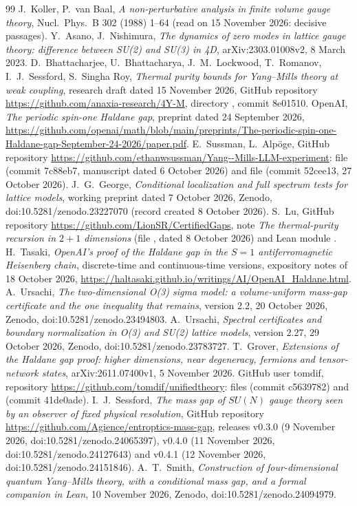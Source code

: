 \documentclass[11pt,a4paper]{article}
\theoremstyle{plain}
\theoremstyle{definition}
\theoremstyle{remark}
\numberwithin{equation}{section}
\begin{document}
{\begin{thebibliography}{99}
 J.~Koller, P.~van Baal, \emph{A non-perturbative analysis in finite volume gauge theory}, Nucl.\ Phys.\ B 302 (1988) 1--64 (read on 15 November 2026: decisive passages).
 Y.~Asano, J.~Nishimura, \emph{The dynamics of zero modes in lattice gauge theory: difference between SU(2) and SU(3) in 4D}, arXiv:2303.01008v2, 8 March 2023.
 D.~Bhattacharjee, U.~Bhattacharya, J.~M.~Lockwood, T.~Romanov, I.~J.~Sessford, S.~Singha Roy, \emph{Thermal purity bounds for Yang--Mills theory at weak coupling}, research draft dated 15 November 2026, GitHub repository \url{https://github.com/anaxia-research/4Y-M}, directory , commit 8e01510.
 OpenAI, \emph{The periodic spin-one Haldane gap}, preprint dated 24 September 2026, \url{https://github.com/openai/math/blob/main/preprints/The-periodic-spin-one-Haldane-gap-September-24-2026/paper.pdf}.
 E.~Sussman, L.~Alp\"oge, GitHub repository \url{https://github.com/ethanwsussman/Yang--Mills-LLM-experiment}: file  (commit 7c88eb7, manuscript dated 6 October 2026) and file  (commit 52cee13, 27 October 2026).
 J.~G.~George, \emph{Conditional localization and full spectrum tests for lattice models}, working preprint dated 7 October 2026, Zenodo, doi:10.5281/zenodo.23227070 (record created 8 October 2026).
 S.~Lu, GitHub repository \url{https://github.com/LionSR/CertifiedGaps}, note \emph{The thermal-purity recursion in $2+1$ dimensions} (file , dated 8 October 2026) and Lean module .
 H.~Tasaki, \emph{OpenAI's proof of the Haldane gap in the $S=1$ antiferromagnetic Heisenberg chain}, discrete-time and continuous-time versions, expository notes of 18 October 2026, \url{https://haltasaki.github.io/writings/AI/OpenAI_Haldane.html}.
 A.~Ursachi, \emph{The two-dimensional O(3) sigma model: a volume-uniform mass-gap certificate and the one inequality that remains}, version 2.2, 20 October 2026, Zenodo, doi:10.5281/zenodo.23494803.
 A.~Ursachi, \emph{Spectral certificates and boundary normalization in O(3) and SU(2) lattice models}, version 2.27, 29 October 2026, Zenodo, doi:10.5281/zenodo.23783727.
 T.~Grover, \emph{Extensions of the Haldane gap proof: higher dimensions, near degeneracy, fermions and tensor-network states}, arXiv:2611.07400v1, 5 November 2026.
 GitHub user tomdif, repository \url{https://github.com/tomdif/unifiedtheory}: files  (commit c5639782) and  (commit 41de0ade).
 I.~J.~Sessford, \emph{The mass gap of $SU(N)$ gauge theory seen by an observer of fixed physical resolution}, GitHub repository \url{https://github.com/Agience/entroptics-mass-gap}, releases v0.3.0 (9 November 2026, doi:10.5281/zenodo.24065397), v0.4.0 (11 November 2026, doi:10.5281/zenodo.24127643) and v0.4.1 (12 November 2026, doi:10.5281/zenodo.24151846).
 A.~T.~Smith, \emph{Construction of four-dimensional quantum Yang--Mills theory, with a conditional mass gap, and a formal companion in Lean}, 10 November 2026, Zenodo, doi:10.5281/zenodo.24094979.
\end{thebibliography}}
\end{document}
